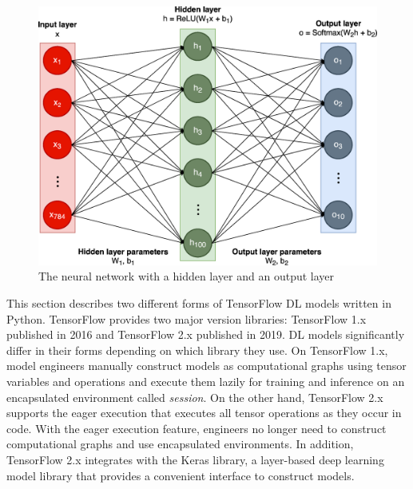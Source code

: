 \begin{figure}[ht!]\centering
\includegraphics[width=1\textwidth]{Fig1.eps}
  \caption{The neural network with a hidden layer and an output layer}
\label{fig:back:model}
\end{figure}

This section describes two different forms of TensorFlow DL models written in
Python.
TensorFlow provides two major version libraries: TensorFlow 1.x published in
2016 and TensorFlow 2.x published in 2019. 
DL models significantly differ in their forms depending on which library
they use. 
On TensorFlow 1.x, model engineers manually construct models as computational
graphs using tensor variables and operations and execute them lazily  for
training and inference on an encapsulated environment
called {\it session}.
On the other hand, TensorFlow 2.x supports the eager execution that executes
all tensor operations as they occur in code. 
With the eager execution feature, engineers no longer need to construct
computational graphs and use encapsulated environments.
In addition, TensorFlow 2.x integrates with the Keras library, a layer-based
deep learning model library that provides a convenient interface to construct
models.

